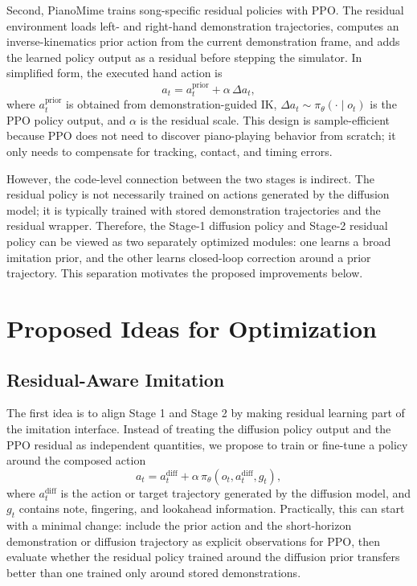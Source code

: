 \documentclass{article}
\newcommand{\policy}{\pi}
\newcommand{\residual}{\Delta a}
\begin{document}
Second, PianoMime trains song-specific residual policies with PPO. The residual environment loads left- and right-hand demonstration trajectories, computes an inverse-kinematics prior action from the current demonstration frame, and adds the learned policy output as a residual before stepping the simulator. In simplified form, the executed hand action is
\begin{equation}
    a_t = a^{\mathrm{prior}}_t + \alpha \, \residual_t,
\end{equation}
where $a^{\mathrm{prior}}_t$ is obtained from demonstration-guided IK, $\residual_t \sim \policy_{\theta}(\cdot \mid o_t)$ is the PPO policy output, and $\alpha$ is the residual scale. This design is sample-efficient because PPO does not need to discover piano-playing behavior from scratch; it only needs to compensate for tracking, contact, and timing errors.

However, the code-level connection between the two stages is indirect. The residual policy is not necessarily trained on actions generated by the diffusion model; it is typically trained with stored demonstration trajectories and the residual wrapper. Therefore, the Stage-1 diffusion policy and Stage-2 residual policy can be viewed as two separately optimized modules: one learns a broad imitation prior, and the other learns closed-loop correction around a prior trajectory. This separation motivates the proposed improvements below.

\section{Proposed Ideas for Optimization}

\subsection{Residual-Aware Imitation}

The first idea is to align Stage 1 and Stage 2 by making residual learning part of the imitation interface. Instead of treating the diffusion policy output and the PPO residual as independent quantities, we propose to train or fine-tune a policy around the composed action
\begin{equation}
    a_t = a^{\mathrm{diff}}_t + \alpha \, \policy_{\theta}(o_t, a^{\mathrm{diff}}_t, g_t),
\end{equation}
where $a^{\mathrm{diff}}_t$ is the action or target trajectory generated by the diffusion model, and $g_t$ contains note, fingering, and lookahead information. Practically, this can start with a minimal change: include the prior action and the short-horizon demonstration or diffusion trajectory as explicit observations for PPO, then evaluate whether the residual policy trained around the diffusion prior transfers better than one trained only around stored demonstrations.
\end{document}
